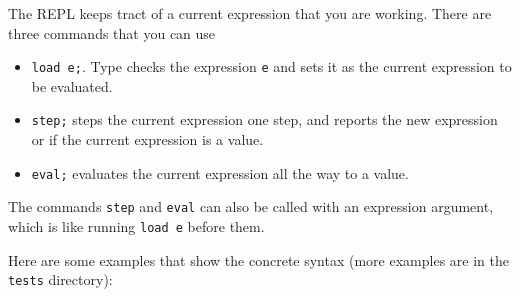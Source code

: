 \documentclass[11pt]{article}
\newcommand\sml[1]{\texttt{#1}}
\begin{document}
The REPL keeps tract of a current expression that you are working.
There are three commands that you can use
\begin{itemize}
\item \sml{load e;}.  Type checks the expression \sml{e} and sets it as
  the current expression to be evaluated.  
\item \sml{step;} steps the current expression one step, and reports the
  new expression or if the current expression is a value.  
\item \sml{eval;} evaluates the current expression all the way to a
  value.  
\end{itemize}
The commands \sml{step} and \sml{eval} can also be called with an
expression argument, which is like running \sml{load e} before them.

Here are some examples that show the concrete syntax (more examples are
in the \sml{tests} directory):
\end{document}
